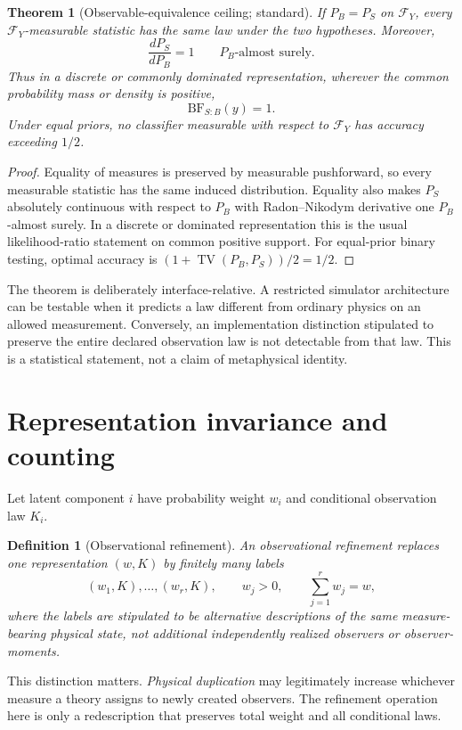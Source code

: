 \documentclass[11pt]{article}
\newtheorem{theorem}{Theorem}
\newtheorem{definition}{Definition}
\begin{document}
\begin{theorem}[Observable-equivalence ceiling; standard]\label{thm:equiv}
If $P_B=P_S$ on $\mathcal F_Y$, every $\mathcal F_Y$-measurable statistic has the same law under the two hypotheses. Moreover,
\[
\frac{dP_S}{dP_B}=1
\qquad P_B\text{-almost surely}.
\]
Thus in a discrete or commonly dominated representation, wherever the common probability mass or density is positive,
\[
\mathrm{BF}_{S:B}(y)=1.
\]
Under equal priors, no classifier measurable with respect to $\mathcal F_Y$ has accuracy exceeding $1/2$.
\end{theorem}

\begin{proof}
Equality of measures is preserved by measurable pushforward, so every measurable statistic has the same induced distribution. Equality also makes $P_S$ absolutely continuous with respect to $P_B$ with Radon--Nikodym derivative one $P_B$-almost surely. In a discrete or dominated representation this is the usual likelihood-ratio statement on common positive support. For equal-prior binary testing, optimal accuracy is $(1+\operatorname{TV}(P_B,P_S))/2=1/2$.
\end{proof}

The theorem is deliberately interface-relative. A restricted simulator architecture can be testable when it predicts a law different from ordinary physics on an allowed measurement. Conversely, an implementation distinction stipulated to preserve the entire declared observation law is not detectable from that law. This is a statistical statement, not a claim of metaphysical identity.

\section{Representation invariance and counting}
Let latent component $i$ have probability weight $w_i$ and conditional observation law $K_i$.

\begin{definition}[Observational refinement]
An observational refinement replaces one representation $(w,K)$ by finitely many labels
\[
(w_1,K),\ldots,(w_r,K),\qquad w_j>0,\qquad \sum_{j=1}^r w_j=w,
\]
where the labels are stipulated to be alternative descriptions of the same measure-bearing physical state, not additional independently realized observers or observer-moments.
\end{definition}

This distinction matters. \emph{Physical duplication} may legitimately increase whichever measure a theory assigns to newly created observers. The refinement operation here is only a redescription that preserves total weight and all conditional laws.
\end{document}

